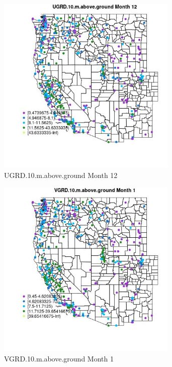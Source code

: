 \begin{figure} 
\centering  
\includegraphics[width=0.77\textwidth]{Code_Outputs/ML_input_report_ML_input_PM25_Step5_part_d_de_duplicated_aves_ML_input_MapObsMo12UGRD10maboveground.jpg} 
\caption{\label{fig:ML_input_report_ML_input_PM25_Step5_part_d_de_duplicated_aves_ML_inputMapObsMo12UGRD10maboveground}UGRD.10.m.above.ground Month 12} 
\end{figure} 
 

\begin{figure} 
\centering  
\includegraphics[width=0.77\textwidth]{Code_Outputs/ML_input_report_ML_input_PM25_Step5_part_d_de_duplicated_aves_ML_input_MapObsMo1VGRD10maboveground.jpg} 
\caption{\label{fig:ML_input_report_ML_input_PM25_Step5_part_d_de_duplicated_aves_ML_inputMapObsMo1VGRD10maboveground}VGRD.10.m.above.ground Month 1} 
\end{figure} 
 

